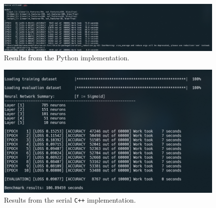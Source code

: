 \begin{figure}[!htbp]
\centering
\includegraphics[width=\linewidth]{static/figures/python.PNG}
\caption{Results from the Python implementation.}
\label{fig:python}
\end{figure}

\begin{figure}[!htbp]
\centering
\includegraphics[width=\linewidth]{static/figures/cpp-serial.PNG}
\caption{Results from the serial \texttt{C++} implementation.}
\label{fig:cpp-serial}
\end{figure}


